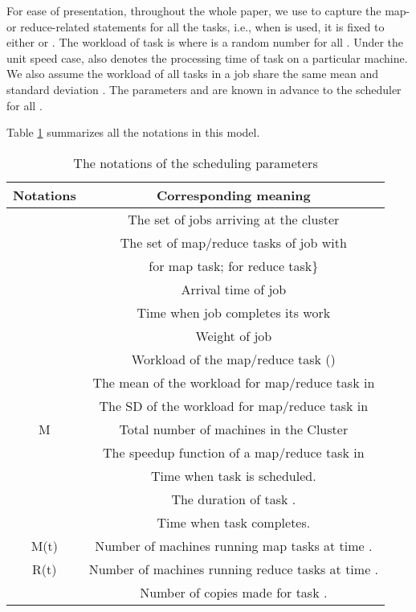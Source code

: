 \documentclass[10pt,conference,compsocconf,letterpaper]{IEEEtran}
\begin{document}
For ease of presentation, throughout the whole paper, we use  to capture the map- or reduce-related statements for all the tasks, i.e., when  is used, it is fixed to either  or . The workload of task  is  where  is a random number for all . Under the unit speed case,  also denotes the processing time of task  on a particular machine. We also assume the workload of all tasks in a job share the same mean  and standard deviation . The parameters  and  are known in advance to the scheduler for all .

Table \ref{Table_1} summarizes all the notations in this model.

\begin{table}
\centering
\caption{The notations of the scheduling parameters}
\label{Table_1}
\begin{tabular}{|c|c|}
  \hline
  Notations &  Corresponding meaning\\
  \hline
  \hline
   & The set of jobs arriving at the cluster\\
  \hline
   & The set of map/reduce tasks of job  with \\
  &  for map task;  for reduce task\}\\
  \hline
   & Arrival time of job \\
  \hline
   & Time when job   completes its work \\
  \hline
   & Weight of job \\
  \hline
   & Workload of the map/reduce task ()\\
  \hline
   & The mean of the workload for map/reduce task in \\
  \hline
   & The SD of the workload for map/reduce task in \\
  \hline
  M & Total number of machines in the Cluster\\
  \hline
    & The speedup function of a map/reduce task in \\
  \hline
    & Time when task  is scheduled.\\
  \hline
     & The duration of task .\\
  \hline
   & Time when task  completes.\\
  \hline
  M(t) & Number of machines running map tasks at time .\\
  \hline
  R(t) & Number of machines running reduce tasks at time .\\
  \hline
   & Number of copies made for task .\\
  \hline
\end{tabular}
\end{table}
\end{document}
